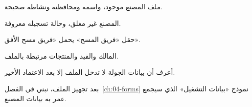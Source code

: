 \begin{rcchecklist}
\begin{checklist}
\item ملف المصنع موجود، واسمه ومحافظته ونشاطه صحيحة.
\item المصنع غير مغلق، وحالة تسجيله معروفة.
\item حقل «فريق المسح» يحمل «فريق مسح الأفق».
\item المالك والقيد والمنتجات مرتبطة بالملف.
\item أعرف أن بيانات الجولة لا تدخل الملف إلا بعد الاعتماد الأخير.
\end{checklist}
\end{rcchecklist}

بعد تجهيز الملف، نبني في الفصل~\ref{ch:04-forms} نموذج «بيانات التشغيل» الذي سيجمع عمر به بيانات المصنع.
